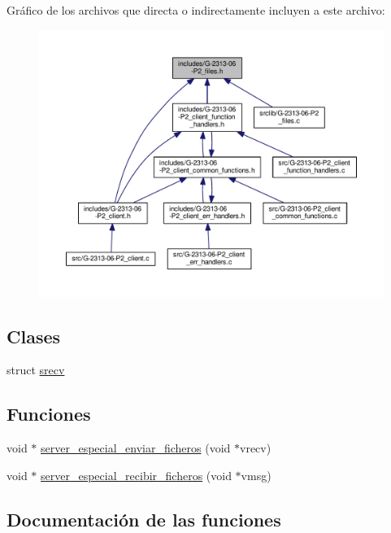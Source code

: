 Gráfico de los archivos que directa o indirectamente incluyen a este archivo\+:\nopagebreak
\begin{figure}[H]
\begin{center}
\leavevmode
\includegraphics[width=350pt]{G-2313-06-P2__files_8h__dep__incl}
\end{center}
\end{figure}
\subsection*{Clases}
\begin{DoxyCompactItemize}
\item 
struct \hyperlink{structsrecv}{srecv}
\end{DoxyCompactItemize}
\subsection*{Funciones}
\begin{DoxyCompactItemize}
\item 
void $\ast$ \hyperlink{G-2313-06-P2__files_8h_ad00af19306b45db3947f1b89ae4b5def}{server\+\_\+especial\+\_\+enviar\+\_\+ficheros} (void $\ast$vrecv)
\item 
void $\ast$ \hyperlink{G-2313-06-P2__files_8h_a6796f20636727f52161d02748cb2b17e}{server\+\_\+especial\+\_\+recibir\+\_\+ficheros} (void $\ast$vmsg)
\end{DoxyCompactItemize}


\subsection{Documentación de las funciones}
